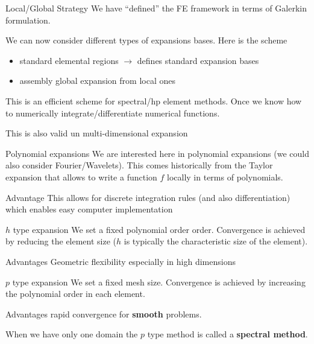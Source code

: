\begin{frame}{Local/Global Strategy}
  We have ``defined'' the FE framework in terms of Galerkin formulation.

  We can now consider different types of expansions bases. Here is the scheme
  \begin{itemize}
  \item standard elemental regions $\rightarrow$ defines standard expansion bases
  \item assembly global expansion from local ones
  \end{itemize}

  This is an efficient scheme for spectral/hp element methods. Once we
  know how to numerically integrate/differentiate numerical
  functions.

  \begin{alertblock}{}
    This is also valid un multi-dimensional expansion
  \end{alertblock}
\end{frame}

\begin{frame}{Polynomial expansions}
  We are interested here in polynomial expansions (we could also
  consider Fourier/Wavelets).  This comes historically from the Taylor
  expansion that allows to write a function $f$ locally in terms of
  polynomials.

  \begin{block}{Advantage}
    This allows for discrete integration rules (and also
    differentiation) which enables easy computer implementation
  \end{block}
\end{frame}

\begin{frame}{$h$ type expansion}
  We set a fixed polynomial order order. Convergence is achieved by
  reducing the element size ($h$ is typically the characteristic size
  of the element).

  \begin{block}{Advantages}
    Geometric flexibility especially in high dimensions
  \end{block}
\end{frame}

\begin{frame}{$p$ type expansion}
  We set a fixed mesh size. Convergence is achieved by
  increasing the polynomial order in each element.

  \begin{block}{Advantages}
    rapid convergence for \textbf{smooth} problems.
  \end{block}
  When we have only one domain the $p$ type method is called a \textbf{spectral method}.
\end{frame}

